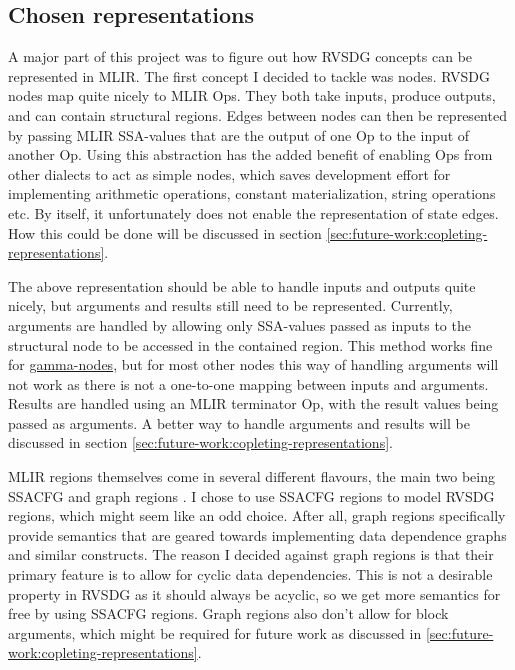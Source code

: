 \subsection{Chosen representations} \label{sec:chosen-representations}
A major part of this project was to figure out how RVSDG concepts can be represented in MLIR. The first concept I decided to tackle was nodes. RVSDG nodes map quite nicely to MLIR Ops. They both take inputs, produce outputs, and can contain structural regions. Edges between nodes can then be represented by passing MLIR SSA-values that are the output of one Op to the input of another Op. Using this abstraction has the added benefit of enabling Ops from other dialects to act as simple nodes, which saves development effort for implementing arithmetic operations, constant materialization, string operations etc. By itself, it unfortunately does not enable the representation of state edges. How this could be done will be discussed in section \ref{sec:future-work:copleting-representations}.

The above representation should be able to handle inputs and outputs quite nicely, but arguments and results still need to be represented. Currently, arguments are handled by allowing only SSA-values passed as inputs to the structural node to be accessed in the contained region. This method works fine for \hyperref[lbl:gamma-node]{gamma-nodes}, but for most other nodes this way of handling arguments will not work as there is not a one-to-one mapping between inputs and arguments. Results are handled using an MLIR terminator Op, with the result values being passed as arguments. A better way to handle arguments and results will be discussed in section \ref{sec:future-work:copleting-representations}.

MLIR regions themselves come in several different flavours, the main two being SSACFG and graph regions \cite{mlir_lang_ref}. I chose to use SSACFG regions to model RVSDG regions, which might seem like an odd choice. After all, graph regions specifically provide semantics that are geared towards implementing data dependence graphs and similar constructs. The reason I decided against graph regions is that their primary feature is to allow for cyclic data dependencies. This is not a desirable property in RVSDG as it should always be acyclic, so we get more semantics for free by using SSACFG regions. Graph regions also don't allow for block arguments, which might be required for future work as discussed in \autoref{sec:future-work:copleting-representations}.

